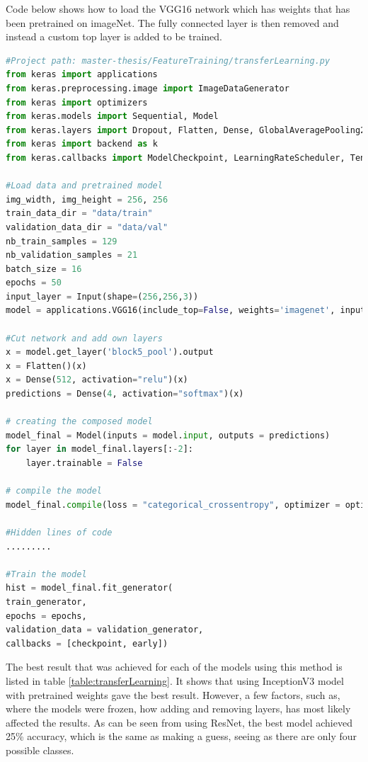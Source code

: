 Code below shows how to load the VGG16 network which has weights that has been pretrained on imageNet. The fully connected layer is then removed and instead a custom top layer is added to be trained. 
\begin{lstlisting}[language=python]
#Project path: master-thesis/FeatureTraining/transferLearning.py
from keras import applications
from keras.preprocessing.image import ImageDataGenerator
from keras import optimizers
from keras.models import Sequential, Model
from keras.layers import Dropout, Flatten, Dense, GlobalAveragePooling2D, Input, Conv2D, MaxPool2D
from keras import backend as k
from keras.callbacks import ModelCheckpoint, LearningRateScheduler, TensorBoard, EarlyStopping

#Load data and pretrained model
img_width, img_height = 256, 256
train_data_dir = "data/train"
validation_data_dir = "data/val"
nb_train_samples = 129
nb_validation_samples = 21
batch_size = 16
epochs = 50
input_layer = Input(shape=(256,256,3))
model = applications.VGG16(include_top=False, weights='imagenet', input_tensor=input_layer, pooling=None)

#Cut network and add own layers
x = model.get_layer('block5_pool').output
x = Flatten()(x)
x = Dense(512, activation="relu")(x)
predictions = Dense(4, activation="softmax")(x)

# creating the composed model
model_final = Model(inputs = model.input, outputs = predictions)
for layer in model_final.layers[:-2]:
    layer.trainable = False
    
# compile the model
model_final.compile(loss = "categorical_crossentropy", optimizer = optimizers.SGD(lr = 0.0001, momentum = 0.9), metrics=["accuracy"])

#Hidden lines of code
.........

#Train the model
hist = model_final.fit_generator(
train_generator,
epochs = epochs,
validation_data = validation_generator,
callbacks = [checkpoint, early])
\end{lstlisting}

The best result  that was achieved for each of the models using this method is listed in
 table \ref{table:transferLearning}. It shows that using InceptionV3 model with pretrained
 weights gave the best result. However, a few factors, such as, where the models were
 frozen, how adding and removing layers, has most likely affected the results. As can be
 seen from using ResNet, the best model achieved 25\% accuracy, which is the same as making a guess, seeing as there are only four possible classes. 


